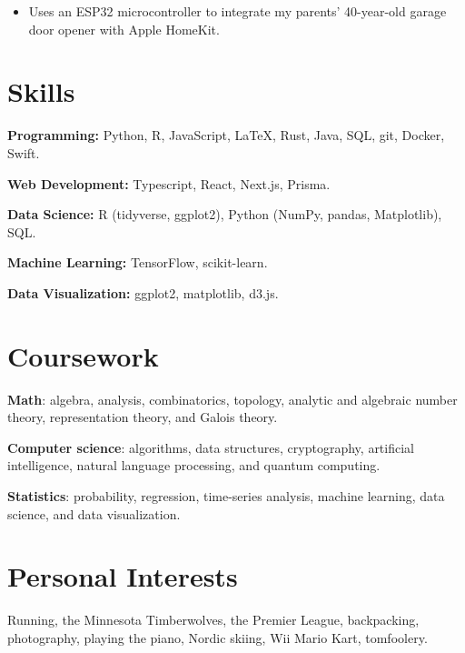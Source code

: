 \documentclass{resume}
\begin{document}

\begin{itemize}
	\item Uses an ESP32 microcontroller to integrate my parents' 40-year-old garage door opener with Apple HomeKit.
\end{itemize}


\section{Skills}

\textbf{Programming:} Python, R, JavaScript, \LaTeX, Rust, Java, SQL, git, Docker, Swift.

\textbf{Web Development:} Typescript, React, Next.js, Prisma.

\textbf{Data Science:} R (tidyverse, ggplot2), Python (NumPy, pandas, Matplotlib), SQL.

\textbf{Machine Learning:} TensorFlow, scikit-learn.

\textbf{Data Visualization:} ggplot2, matplotlib, d3.js.

\section{Coursework}

\textbf{Math}:
algebra, analysis, combinatorics, topology, analytic and algebraic number theory, representation theory, and Galois theory.

\textbf{Computer science}:
algorithms, data structures, cryptography, artificial intelligence, natural language processing, and quantum computing.

\textbf{Statistics}:
probability, regression, time-series analysis, machine learning, data science, and data visualization.

\section{Personal Interests}

Running, the Minnesota Timberwolves, the Premier League, backpacking, photography, playing the piano, Nordic skiing, Wii Mario Kart, tomfoolery.
\end{document}
